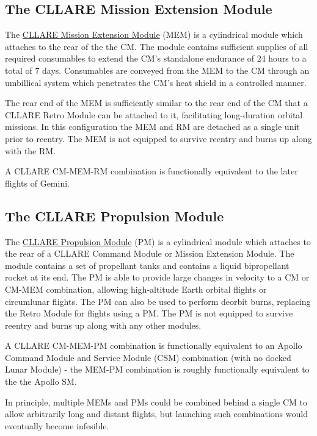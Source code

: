 \documentclass{report}
\begin{document}
\subsection{The CLLARE Mission Extension Module}

The \href{http://cstart.org/wiki/CLLARE_Mission_Extension_Module}{CLLARE Mission Extension Module} (MEM) is a cylindrical module which attaches to the rear of the the CM.  The module contains sufficient supplies of all required consumables to extend the CM's standalone endurance of 24 hours to a total of 7 days.  Consumables are conveyed from the MEM to the CM through an umbillical system which penetrates the CM's heat shield in a controlled manner.

The rear end of the MEM is sufficiently similar to the rear end of the CM that a CLLARE Retro Module can be attached to it, facilitating long-duration orbital missions.  In this configuration the MEM and RM are detached as a single unit prior to reentry.  The MEM is not equipped to survive reentry and burns up along with the RM.

A CLLARE CM-MEM-RM combination is functionally equivalent to the later flights of Gemini.

\subsection{The CLLARE Propulsion Module}

The \href{http://cstart.org/wiki/CLLARE_Propulsion_Module}{CLLARE Propulsion Module} (PM) is a cylindrical module which attaches to the rear of a CLLARE Command Module or Mission Extension Module.  The module contains a set of propellant tanks and contains a liquid bipropellant rocket at its end.  The PM is able to provide large changes in velocity to a CM or CM-MEM combination, allowing high-altitude Earth orbital flights or circumlunar flights.  The PM can also be used to perform deorbit burns, replacing the Retro Module for flights using a PM.  The PM is not equipped to survive reentry and burns up along with any other modules.

A CLLARE CM-MEM-PM combination is functionally equivalent to an Apollo Command Module and Service Module (CSM) combination (with no docked Lunar Module) - the MEM-PM combination is roughly functionally equivalent to the the Apollo SM.

In principle, multiple MEMs and PMs could be combined behind a single CM to allow arbitrarily long and distant flights, but launching such combinations would eventually become infesible.
\end{document}
